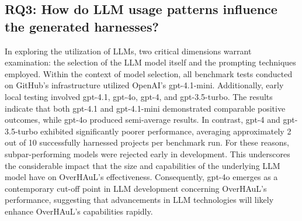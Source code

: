 \documentclass[
  a4paper,
]{scrreprt}
\newenvironment{Shaded}{\begin{snugshade}}{\end{snugshade}}
\newcommand{\ControlFlowTok}[1]{\textcolor[rgb]{0.85,0.12,0.09}{#1}}
\newcommand{\DataTypeTok}[1]{\textcolor[rgb]{0.47,0.16,0.63}{#1}}
\newcommand{\DecValTok}[1]{\textcolor[rgb]{0.47,0.16,0.63}{#1}}
\newcommand{\KeywordTok}[1]{\textcolor[rgb]{0.85,0.12,0.09}{#1}}
\newcommand{\NormalTok}[1]{\textcolor[rgb]{0.33,0.33,0.33}{#1}}
\newcommand{\OperatorTok}[1]{\textcolor[rgb]{0.00,0.46,0.62}{#1}}
\theoremstyle{definition}
\theoremstyle{remark}
\begin{document}
%

\subsection{RQ3: How do LLM usage patterns influence the generated
harnesses?}\label{rq3-how-do-llm-usage-patterns-influence-the-generated-harnesses}

In exploring the utilization of LLMs, two critical dimensions warrant
examination: the selection of the LLM model itself and the prompting
techniques employed. Within the context of model selection, all
benchmark tests conducted on GitHub's infrastructure utilized OpenAI's
gpt-4.1-mini. Additionally, early local testing involved gpt-4.1,
gpt-4o, gpt-4, and gpt-3.5-turbo. The results indicate that both gpt-4.1
and gpt-4.1-mini demonstrated comparable positive outcomes, while gpt-4o
produced semi-average results. In contrast, gpt-4 and gpt-3.5-turbo
exhibited significantly poorer performance, averaging approximately 2
out of 10 successfully harnessed projects per benchmark run. For these
reasons, subpar-performing models were rejected early in development.
This underscores the considerable impact that the size and capabilities
of the underlying LLM model have on OverHAuL's effectiveness.
Consequently, gpt-4o emerges as a contemporary cut-off point in LLM
development concerning OverHAuL's performance, suggesting that
advancements in LLM technologies will likely enhance OverHAuL's
capabilities rapidly.
\end{document}
